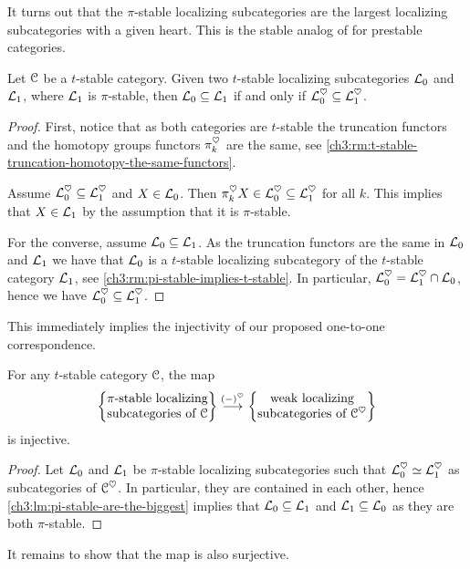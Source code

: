 It turns out that the $\pi$-stable localizing subcategories are the largest localizing subcategories with a given heart. This is the stable analog of \cite[C.5.2.5]{lurie_SAG} for prestable categories. 

\begin{lemma}
    \label{ch3:lm:pi-stable-are-the-biggest}
    Let $\EuScript{C}$ be a $t$-stable category. Given two $t$-stable localizing subcategories $\mathcal{L}_0$ and $\mathcal{L}_1$, where $\mathcal{L}_1$ is $\pi$-stable, then $\mathcal{L}_0 \subseteq \mathcal{L}_1$ if and only if $\mathcal{L}_0^\heartsuit \subseteq \mathcal{L}_1^\heartsuit$. 
\end{lemma}
\begin{proof}
    First, notice that as both categories are $t$-stable the truncation functors and the homotopy groups functors $\pi_k^\heartsuit$ are the same, see \cref{ch3:rm:t-stable-truncation-homotopy-the-same-functors}. 
    
    Assume $\mathcal{L}_0^\heartsuit \subseteq \mathcal{L}_1^\heartsuit$ and $X\in \mathcal{L}_0$. Then $\pi_k^\heartsuit X\in \mathcal{L}_0^\heartsuit \subseteq \mathcal{L}_1^\heartsuit$ for all $k$. This implies that $X\in \mathcal{L}_1$ by the assumption that it is $\pi$-stable. 

    For the converse, assume $\mathcal{L}_0\subseteq \mathcal{L}_1$. As the truncation functors are the same in $\mathcal{L}_0$ and $\mathcal{L}_1$ we have that $\mathcal{L}_0$ is a $t$-stable localizing subcategory of the $t$-stable category $\mathcal{L}_1$, see \cref{ch3:rm:pi-stable-implies-t-stable}. In particular, $\mathcal{L}_0^\heartsuit = \mathcal{L}_1^\heartsuit \cap \mathcal{L}_0$, hence we have $\mathcal{L}_0^\heartsuit \subseteq \mathcal{L}_1^\heartsuit$. 
\end{proof}

This immediately implies the injectivity of our proposed one-to-one correspondence. 

\begin{corollary}
    \label{ch3:cor:pi-stable-heart-injective}
    For any $t$-stable category $\EuScript{C}$, the map
    \[\left\{ \begin{matrix} \pi\text{-stable localizing}\\ \text{subcategories of }\EuScript{C} \end{matrix} \right\}\overset{(-)^\heartsuit}{\longrightarrow} \left\{ \begin{matrix} \text{weak localizing}\\ \text{subcategories of }\EuScript{C}^\heartsuit \end{matrix} \right\}\] 
    is injective. 
\end{corollary}
\begin{proof}
    Let $\mathcal{L}_0$ and $\mathcal{L}_1$ be $\pi$-stable localizing subcategories such that $\mathcal{L}_0^\heartsuit \simeq \mathcal{L}_1^\heartsuit$ as subcategories of $\EuScript{C}^\heartsuit$. In particular, they are contained in each other, hence \cref{ch3:lm:pi-stable-are-the-biggest} implies that $\mathcal{L}_0 \subseteq \mathcal{L}_1$ and $\mathcal{L}_1 \subseteq \mathcal{L}_0$ as they are both $\pi$-stable. 
\end{proof}

It remains to show that the map is also surjective. 

